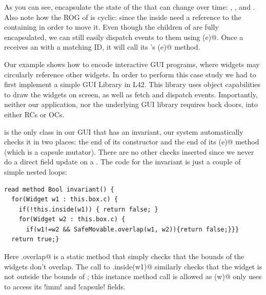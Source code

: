 As you can see, \Q@Box@es encapsulate the state of the \Q@SafeMovable@s that can change over time:
\Q@left@, \Q@top@, and \Q@children@. Also note how the ROG of \Q@Box@ is cyclic: since
the \Q@MoveAction@s inside \Q@Button@s need a reference to the containing \Q@Box@ in order to move it.
Even though the children of \Q@SafeMovable@s are fully encapsulated, we can still easily dispatch events to them using \Q@dispatch(e)@. Once a \Q@Button@ receives an \Q@Event@ with a matching ID, it will call its \Q@Action@'s \Q@process(e)@ method. 

Our example shows how to encode interactive GUI programs, where widgets may circularly reference other widgets.
In order to perform this case study we had to first implement a simple GUI Library in L42. This library uses object capabilities to draw the widgets on screen, as well as fetch and dispatch events. Importantly, neither our application, nor the underlying GUI library requires back doors, into either RCs or OCs.

\Q@SafeMovable@ is the only class in our GUI that has an invariant, our system automatically checks it in two places: the end of its constructor and the end of its \Q@dispatch(e)@ method (which is a capsule mutator). There are no other checks inserted since we never do a direct field update on a \Q@SafeMovable@. The code for the invariant is just a couple of simple nested loops:
\begin{lstlisting}
read method Bool invariant() {
  for(Widget w1 : this.box.c) {
    if(!this.inside(w1)) { return false; }
    for(Widget w2 : this.box.c) {
      if(w1!=w2 && SafeMovable.overlap(w1, w2)){return false;}}}
  return true;}
\end{lstlisting}

Here \Q@SafeMovable.overlap@ is a static method that simply checks that the bounds of the widgets don't overlap. The call to \Q@this.inside(w1)@ similarly checks that the widget is not outside the bounds of \Q@this@; this instance method call is allowed as \Q@inside(w)@ only uses \Q@this@ to access its \Q!imm! and \Q!capsule! fields.

